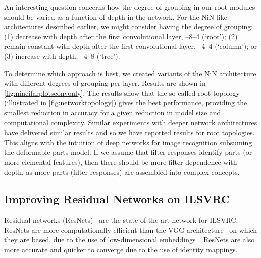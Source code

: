 \documentclass[thesis]{subfiles}
\begin{document}
	An interesting question concerns how the degree of grouping in our root modules should be varied as a function of depth in the network. For the NiN-like architectures described earlier, we might consider having the degree of grouping: (1) decrease with depth after the first convolutional layer, --8--4 (`root'); (2) remain constant with depth after the first convolutional layer, --4--4 (`column'); or (3) increase with depth, --4--8 (`tree').
	
	To determine which approach is best, we created variants of the NiN architecture with different degrees of grouping per layer. Results are shown in \cref{fig:nincifarplotsconvonly}. The results show that the so-called root topology (illustrated in \cref{fig:networktopology}) gives the best performance, providing the smallest reduction in accuracy for a given reduction in model size and computational complexity. Similar experiments with deeper network architectures have delivered similar results and so we have reported results for root topologies. This aligns with the intuition of deep networks for image recognition subsuming the deformable parts model. If we assume that filter responses identify parts (or more elemental features), then there should be more filter dependence with depth, as more parts (filter responses) are assembled into complex concepts.
	
	\subsection{Improving Residual Networks on ILSVRC}
	Residual networks (ResNets)~\citep{He2015} are the state-of-the art network for ILSVRC. ResNets are more computationally efficient than the VGG architecture~\cite{Simonyan2014verydeep} on which they are based, due to the use of low-dimensional embeddings~\citep{Lin2013NiN}. ResNets are also more accurate and quicker to converge due to the use of identity mappings.
	
\end{document}
